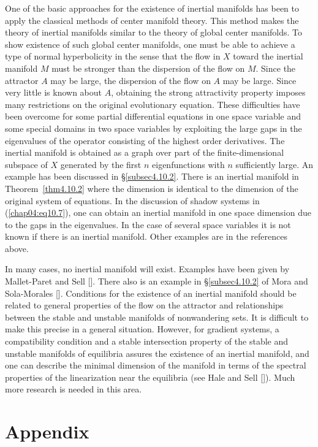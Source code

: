 \documentclass{surv-l}
\theoremstyle{plain}
\theoremstyle{definition}
\numberwithin{equation}{section}
\numberwithin{figure}{chapter}
\begin{document}
One of the basic approaches for the existence of inertial manifolds has been to apply the classical methods of center manifold theory. This method makes the theory of inertial manifolds similar to the theory of global center manifolds. To show existence of such global center manifolds, one must be able to achieve a type of normal hyperbolicity in the sense that the flow in $X$ toward the inertial manifold $M$ must be stronger than the dispersion of the flow on $M$. Since the attractor $A$ may be large, the dispersion of the flow on $A$ may be large. Since very little is known about $A$, obtaining the strong attractivity property imposes many restrictions on the original evolutionary equation. These difficulties have been overcome for some partial differential equations in one space variable and some special domains in two space variables by exploiting the large gaps in the eigenvalues of the operator consisting of the highest order derivatives. The inertial manifold is obtained as a graph over part of the finite-dimensional subspace of $X$ generated by the first $n$ eigenfunctions with $n$ sufficiently large. An example has been discussed in \S\ref{subsec4.10.2}. There is an inertial manifold in Theorem~\ref{thm4.10.2} where the dimension is identical to the dimension of the original system of equations. In the discussion of shadow systems in (\ref{chap04:eq10.7}), one can obtain an inertial manifold in one space dimension due to the gaps in the eigenvalues. In the case of several space variables it is not known if there is an inertial manifold. Other examples are in the references above.

In many cases, no inertial manifold will exist. Examples have been given by Mallet-Paret and Sell [\citeyear{1988ms}]. There also is an example in \S\ref{subsec4.10.2} of Mora and Sola-Morales [\citeyear{1987ms}]. Conditions for the existence of an inertial manifold should be related to general properties of the flow on the attractor and relationships between the stable and unstable manifolds of nonwandering sets. It is difficult to make this precise in a general situation. However, for gradient systems, a compatibility condition and a stable intersection property of the stable and unstable manifolds of equilibria assures the existence of an inertial manifold, and one can describe the minimal dimension of the manifold in terms of the spectral properties of the linearization near the equilibria (see Hale and Sell [\citeyear{1988hs}]). Much more research is needed in this area.

\chapter*{Appendix}
\end{document}
